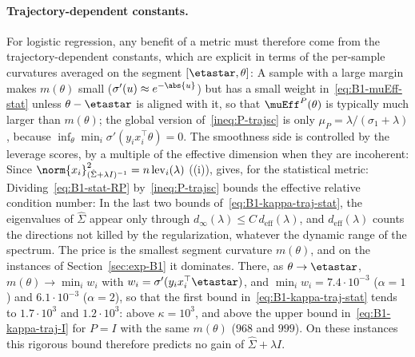 \paragraph{Trajectory-dependent constants.}
For logistic regression, any benefit of a metric must therefore come from the trajectory-dependent constants, which are
explicit in terms of the per-sample curvatures averaged on the segment $[\etastar,\theta]$:
A sample with a large margin makes $m(\theta)$ small ($\sigma'(u)\approx e^{-\abs{u}}$) but has a small weight
in~\eqref{eq:B1-muEff-stat} unless $\theta-\etastar$ is aligned with it, so that $\muEff^P(\theta)$ is typically much
larger than $m(\theta)$; the global version of~\eqref{ineq:P-trajsc} is only $\mu_P=\lambda/(\sigma_1+\lambda)$, because
$\inf_\theta\min_i\sigma'(y_ix_i^\top\theta)=0$. The smoothness side is controlled by the leverage scores, by a
multiple of the effective dimension when they are incoherent:
Since $\norm{x_i}_{(\hat\Sigma+\lambda I)^{-1}}^2=n\,\mathrm{lev}_i(\lambda)$ ((i)),
 gives, for the statistical metric:
Dividing~\eqref{eq:B1-stat-RP} by~\eqref{ineq:P-trajsc} bounds the effective relative condition number:
In the last two bounds of~\eqref{eq:B1-kappa-traj-stat}, the eigenvalues of $\hat\Sigma$ appear only through
$d_\infty(\lambda)\le C\,d_{\mathrm{eff}}(\lambda)$, and $d_{\mathrm{eff}}(\lambda)$ counts the directions not killed by
the regularization, whatever the dynamic range of the spectrum. The price is the smallest segment curvature
$m(\theta)$, and on the instances of Section~\ref{sec:exp-B1} it dominates. There, as $\theta\to\etastar$,
$m(\theta)\to\min_iw_i$ with $w_i=\sigma'(y_ix_i^\top\etastar)$, and $\min_iw_i=7.4\cdot10^{-3}$ ($\alpha=1$) and
$6.1\cdot10^{-3}$ ($\alpha=2$), so that the first bound in~\eqref{eq:B1-kappa-traj-stat} tends to $1.7\cdot10^3$ and
$1.2\cdot10^3$: above $\kappa=10^3$, and above the upper bound in~\eqref{eq:B1-kappa-traj-I} for $P=I$ with the same
$m(\theta)$ ($968$ and $999$). On these instances this rigorous bound therefore predicts no gain of
$\hat\Sigma+\lambda I$.

